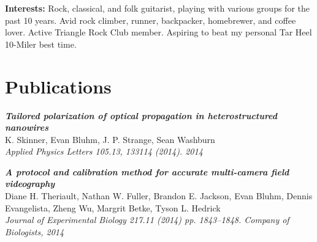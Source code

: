 \documentclass[]{fancy-resume}
\begin{document}
\textbf{Interests:} Rock, classical, and folk guitarist, playing with various groups for the past 10 years. Avid rock climber, runner, backpacker, homebrewer, and coffee lover. Active Triangle Rock Club member. Aspiring to beat my personal Tar Heel 10-Miler best time. 

\section{Publications}
\textit{\textbf{Tailored polarization of optical propagation in heterostructured nanowires}}\\
K. Skinner, Evan Bluhm, J. P. Strange, Sean Washburn\\
\emph{Applied Physics Letters 105.13, 133114 (2014). 2014}

\textbf{\textit{A protocol and calibration method for accurate multi-camera field videography}}\\
Diane H. Theriault, Nathan W. Fuller, Brandon E. Jackson, Evan Bluhm, Dennis Evangelista, Zheng Wu, Margrit Betke, Tyson L. Hedrick\\
\emph{Journal of Experimental Biology 217.11 (2014) pp. 1843–1848. Company of Biologists, 2014}
\end{document}
